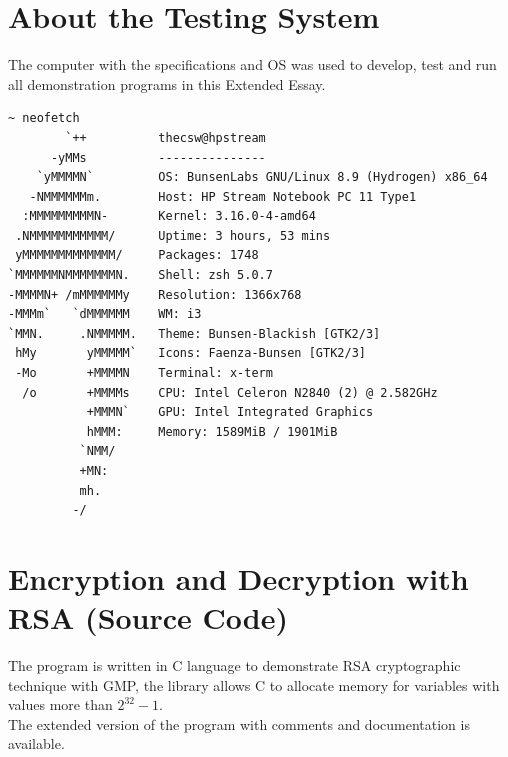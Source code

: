 \documentclass[a4paper, 12pt]{article}
\begin{document}
\section{About the Testing System}
\label{specs}
The computer with the specifications and OS\cite{BunsenLabs}\cite{Debian} was used to develop, test and run all demonstration
programs\cite{github} in this Extended Essay.

\begin{lstlisting}[caption=System Specifications]
  ~ neofetch
        `++          thecsw@hpstream
      -yMMs          ---------------
    `yMMMMN`         OS: BunsenLabs GNU/Linux 8.9 (Hydrogen) x86_64
   -NMMMMMMm.        Host: HP Stream Notebook PC 11 Type1 
  :MMMMMMMMMN-       Kernel: 3.16.0-4-amd64
 .NMMMMMMMMMMM/      Uptime: 3 hours, 53 mins
 yMMMMMMMMMMMMM/     Packages: 1748
`MMMMMMNMMMMMMMN.    Shell: zsh 5.0.7
-MMMMN+ /mMMMMMMy    Resolution: 1366x768
-MMMm`   `dMMMMMM    WM: i3
`MMN.     .NMMMMM.   Theme: Bunsen-Blackish [GTK2/3]
 hMy       yMMMMM`   Icons: Faenza-Bunsen [GTK2/3]
 -Mo       +MMMMN    Terminal: x-term
  /o       +MMMMs    CPU: Intel Celeron N2840 (2) @ 2.582GHz
           +MMMN`    GPU: Intel Integrated Graphics
           hMMM:     Memory: 1589MiB / 1901MiB
          `NMM/ 
          +MN:                               
          mh. 
         -/ 

  \end{lstlisting}

\newpage 

\section{Encryption and Decryption with RSA (Source Code)}
\label{big}
The program is written in C\cite{Clang} language to demonstrate RSA cryptographic technique
with GMP\cite{gmp}, the library allows C to allocate memory for variables with values more than $2 ^{32} − 1$.\\

The extended version of the program with comments and documentation is available\cite{github}.
\end{document}
